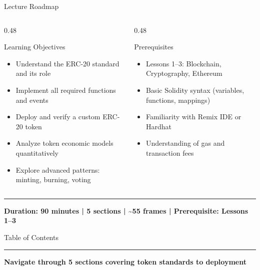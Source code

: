 \documentclass[8pt,aspectratio=169]{beamer}
\newcommand{\bottomnote}[1]{\vfill\vspace{-2mm}\textcolor{mllavender2}{\rule{\textwidth}{0.4pt}}\vspace{1mm}\footnotesize\textbf{#1}}
\begin{document}
\begin{frame}{Lecture Roadmap}
  \vspace{4mm}
  \begin{columns}[T]
    \begin{column}{0.48\textwidth}
      \begin{block}{Learning Objectives}
        \begin{itemize}\setlength\itemsep{1pt}
          \item Understand the ERC-20 standard and its role
          \item Implement all required functions and events
          \item Deploy and verify a custom ERC-20 token
          \item Analyze token economic models quantitatively
          \item Explore advanced patterns: minting, burning, voting
        \end{itemize}
      \end{block}
    \end{column}
    \begin{column}{0.48\textwidth}
      \begin{block}{Prerequisites}
        \begin{itemize}\setlength\itemsep{1pt}
          \item Lessons 1--3: Blockchain, Cryptography, Ethereum
          \item Basic Solidity syntax (variables, functions, mappings)
          \item Familiarity with Remix IDE or Hardhat
          \item Understanding of gas and transaction fees
        \end{itemize}
      \end{block}
    \end{column}
  \end{columns}
  \bottomnote{Duration: 90 minutes | 5 sections | \textasciitilde55 frames | Prerequisite: Lessons 1--3}
\end{frame}

\begin{frame}{Table of Contents}
  \tableofcontents
  \bottomnote{Navigate through 5 sections covering token standards to deployment}
\end{frame}
\end{document}
